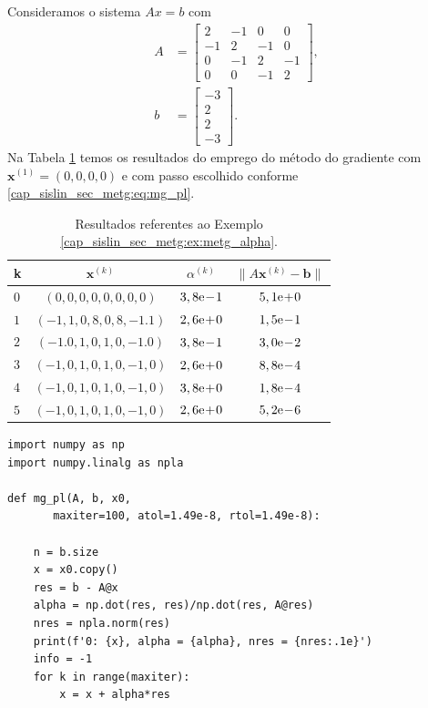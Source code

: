 \begin{ex}\label{ex:metg_alpha}
  Consideramos o sistema $Ax = b$ com
  \begin{align}
    A &=
    \begin{bmatrix}
      2 & -1 & 0 & 0\\
      -1 & 2 & -1 & 0\\
      0 & -1 & 2 & -1 \\
      0 & 0 & -1 & 2
    \end{bmatrix},\\
    b &=
    \begin{bmatrix}
      -3\\
      2\\
      2\\
      -3
    \end{bmatrix}.
  \end{align}
  Na Tabela \ref{cap_sislin_sec_metg:tab:metg_alpha} temos os resultados do emprego do método do gradiente com $\pmb{x}^{(1)} = (0, 0, 0, 0)$ e com passo escolhido conforme \eqref{cap_sislin_sec_metg:eq:mg_pl}.

  \begin{table}[H]
    \centering
    \caption{Resultados referentes ao Exemplo \ref{cap_sislin_sec_metg:ex:metg_alpha}.}
    \label{cap_sislin_sec_metg:tab:metg_alpha}
    \begin{tabular}{l|c|cc}
      k & $\pmb{x}^{(k)}$ & $\alpha^{(k)}$ & $\|A\pmb{x}^{(k)}-\pmb{b}\|$\\\hline
      $0$ & $(0,0, 0,0, 0,0, 0,0)$ & $3,8\mathrm{e}\!-\!1$ & $5,1\mathrm{e}\!+\!0$ \\
      $1$ & $(-1,1, 0,8, 0,8, -1.1)$ & $2,6\mathrm{e}\!+\!0$ & $1,5\mathrm{e}\!-\!1$ \\
      $2$ & $(-1.0, 1,0, 1,0, -1.0)$ & $3,8\mathrm{e}\!-\!1$ & $3,0\mathrm{e}\!-\!2$ \\
      $3$ & $(-1,0, 1,0, 1,0, -1,0)$ & $2,6\mathrm{e}\!+\!0$ & $8,8\mathrm{e}\!-\!4$ \\
      $4$ & $(-1,0, 1,0, 1,0, -1,0)$ & $3,8\mathrm{e}\!+\!0$ & $1,8\mathrm{e}\!-\!4$ \\
      $5$ & $(-1,0, 1,0, 1,0, -1,0)$ & $2,6\mathrm{e}\!+\!0$ & $5,2\mathrm{e}\!-\!6$ \\\hline
    \end{tabular}
  \end{table}

\begin{lstlisting}
import numpy as np
import numpy.linalg as npla

def mg_pl(A, b, x0,
       maxiter=100, atol=1.49e-8, rtol=1.49e-8):
    
    n = b.size
    x = x0.copy()
    res = b - A@x
    alpha = np.dot(res, res)/np.dot(res, A@res)
    nres = npla.norm(res)
    print(f'0: {x}, alpha = {alpha}, nres = {nres:.1e}')
    info = -1
    for k in range(maxiter):
        x = x + alpha*res
        

\end{lstlisting}
\end{ex}
